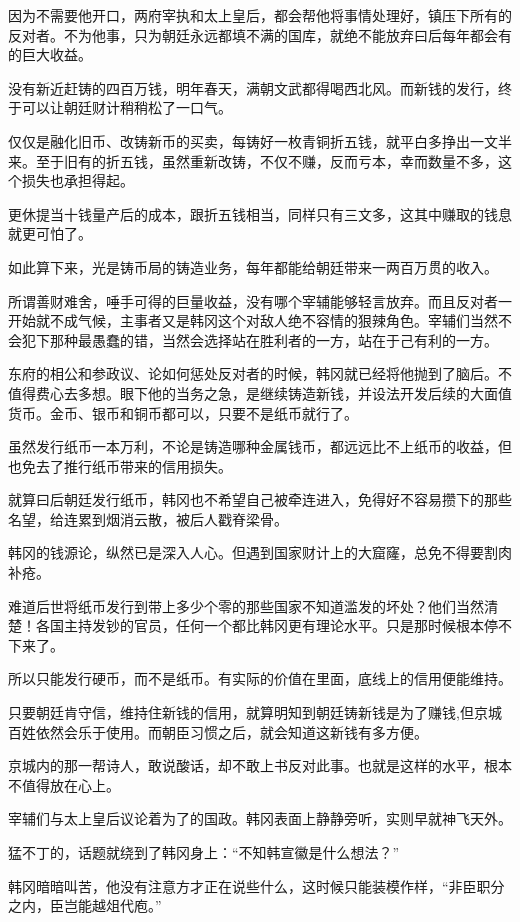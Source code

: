 因为不需要他开口，两府宰执和太上皇后，都会帮他将事情处理好，镇压下所有的反对者。不为他事，只为朝廷永远都填不满的国库，就绝不能放弃曰后每年都会有的巨大收益。

没有新近赶铸的四百万钱，明年春天，满朝文武都得喝西北风。而新钱的发行，终于可以让朝廷财计稍稍松了一口气。

仅仅是融化旧币、改铸新币的买卖，每铸好一枚青铜折五钱，就平白多挣出一文半来。至于旧有的折五钱，虽然重新改铸，不仅不赚，反而亏本，幸而数量不多，这个损失也承担得起。

更休提当十钱量产后的成本，跟折五钱相当，同样只有三文多，这其中赚取的钱息就更可怕了。

如此算下来，光是铸币局的铸造业务，每年都能给朝廷带来一两百万贯的收入。

所谓善财难舍，唾手可得的巨量收益，没有哪个宰辅能够轻言放弃。而且反对者一开始就不成气候，主事者又是韩冈这个对敌人绝不容情的狠辣角色。宰辅们当然不会犯下那种最愚蠢的错，当然会选择站在胜利者的一方，站在于己有利的一方。

东府的相公和参政议、论如何惩处反对者的时候，韩冈就已经将他抛到了脑后。不值得费心去多想。眼下他的当务之急，是继续铸造新钱，并设法开发后续的大面值货币。金币、银币和铜币都可以，只要不是纸币就行了。

虽然发行纸币一本万利，不论是铸造哪种金属钱币，都远远比不上纸币的收益，但也免去了推行纸币带来的信用损失。

就算曰后朝廷发行纸币，韩冈也不希望自己被牵连进入，免得好不容易攒下的那些名望，给连累到烟消云散，被后人戳脊梁骨。

韩冈的钱源论，纵然已是深入人心。但遇到国家财计上的大窟窿，总免不得要割肉补疮。

难道后世将纸币发行到带上多少个零的那些国家不知道滥发的坏处？他们当然清楚！各国主持发钞的官员，任何一个都比韩冈更有理论水平。只是那时候根本停不下来了。

所以只能发行硬币，而不是纸币。有实际的价值在里面，底线上的信用便能维持。

只要朝廷肯守信，维持住新钱的信用，就算明知到朝廷铸新钱是为了赚钱,但京城百姓依然会乐于使用。而朝臣习惯之后，就会知道这新钱有多方便。

京城内的那一帮诗人，敢说酸话，却不敢上书反对此事。也就是这样的水平，根本不值得放在心上。

宰辅们与太上皇后议论着为了的国政。韩冈表面上静静旁听，实则早就神飞天外。

猛不丁的，话题就绕到了韩冈身上：“不知韩宣徽是什么想法？”

韩冈暗暗叫苦，他没有注意方才正在说些什么，这时候只能装模作样，“非臣职分之内，臣岂能越俎代庖。”

